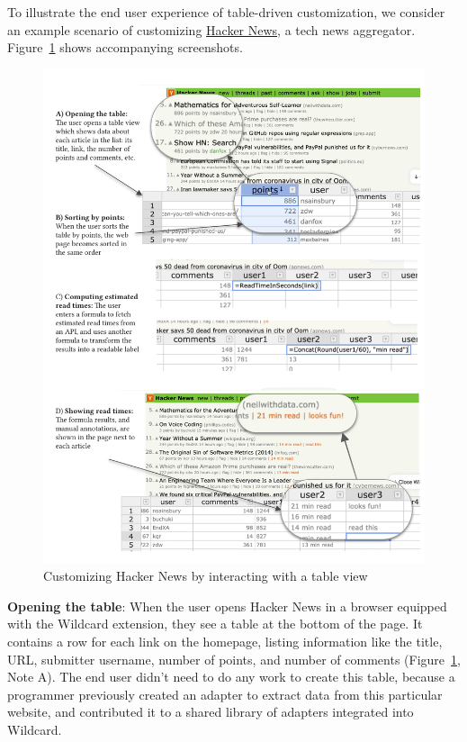 \documentclass[sigplan,screen,10pt,anonymous,review]{acmart}
\begin{document}
To illustrate the end user experience of table-driven customization, we
consider an example scenario of customizing
\href{https://news.ycombinator.com/}{Hacker News}, a tech news
aggregator. Figure~\ref{fig:hacker-news} shows accompanying screenshots.

\begin{figure}
\hypertarget{fig:hacker-news}{%
\centering
\includegraphics[width=\textwidth]{media/hacker-news.png}
\caption{Customizing Hacker News by interacting with a table view}\label{fig:hacker-news}
}
\end{figure}

\textbf{Opening the table}: When the user opens Hacker News in a browser
equipped with the Wildcard extension, they see a table at the bottom of
the page. It contains a row for each link on the homepage, listing
information like the title, URL, submitter username, number of points,
and number of comments (Figure~\ref{fig:hacker-news}, Note A). The end
user didn't need to do any work to create this table, because a
programmer previously created an adapter to extract data from this
particular website, and contributed it to a shared library of adapters
integrated into Wildcard.
\end{document}
